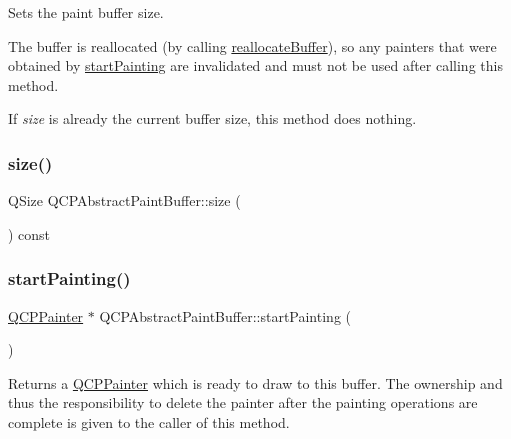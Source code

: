 Sets the paint buffer size.

The buffer is reallocated (by calling \mbox{\hyperlink{class_q_c_p_abstract_paint_buffer_aee7506a52bd7e5a07c2af27935eb13e7}{reallocate\+Buffer}}), so any painters that were obtained by \mbox{\hyperlink{class_q_c_p_abstract_paint_buffer_a9e9f29b19c033cf02fb96f1a148463f3}{start\+Painting}} are invalidated and must not be used after calling this method.

If {\itshape size} is already the current buffer size, this method does nothing. \mbox{\label{class_q_c_p_abstract_paint_buffer_a3ea8284e547985c5d263f26a6adfa11f}} 
\subsubsection{\texorpdfstring{size()}{size()}}
{\footnotesize\ttfamily Q\+Size Q\+C\+P\+Abstract\+Paint\+Buffer\+::size (\begin{DoxyParamCaption}{ }\end{DoxyParamCaption}) const\hspace{0.3cm}{\ttfamily [inline]}}

\mbox{\label{class_q_c_p_abstract_paint_buffer_a9e9f29b19c033cf02fb96f1a148463f3}} 
\subsubsection{\texorpdfstring{startPainting()}{startPainting()}}
{\footnotesize\ttfamily \mbox{\hyperlink{class_q_c_p_painter}{Q\+C\+P\+Painter}} $\ast$ Q\+C\+P\+Abstract\+Paint\+Buffer\+::start\+Painting (\begin{DoxyParamCaption}{ }\end{DoxyParamCaption})\hspace{0.3cm}{\ttfamily [pure virtual]}}

Returns a \mbox{\hyperlink{class_q_c_p_painter}{Q\+C\+P\+Painter}} which is ready to draw to this buffer. The ownership and thus the responsibility to delete the painter after the painting operations are complete is given to the caller of this method.

